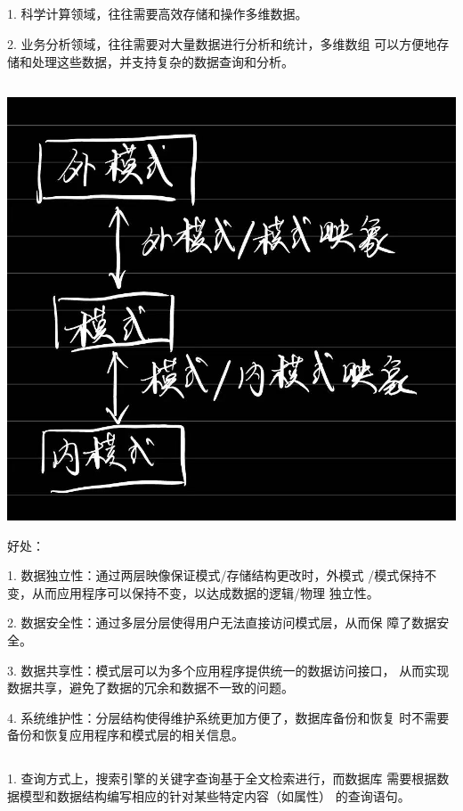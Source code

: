 \documentclass[UTF8]{ctexart}
\begin{document}
\subsection{}

1. 科学计算领域，往往需要高效存储和操作多维数据。

2. 业务分析领域，往往需要对大量数据进行分析和统计，多维数组
可以方便地存储和处理这些数据，并支持复杂的数据查询和分析。

\subsection{}

\includegraphics[width=.8\textwidth]{./pics/1.jpeg}

好处：

1. 数据独立性：通过两层映像保证模式/存储结构更改时，外模式
/模式保持不变，从而应用程序可以保持不变，以达成数据的逻辑/物理
独立性。

2. 数据安全性：通过多层分层使得用户无法直接访问模式层，从而保
障了数据安全。

3. 数据共享性：模式层可以为多个应用程序提供统一的数据访问接口，
从而实现数据共享，避免了数据的冗余和数据不一致的问题。

4. 系统维护性：分层结构使得维护系统更加方便了，数据库备份和恢复
时不需要备份和恢复应用程序和模式层的相关信息。

\subsection{}

1. 查询方式上，搜索引擎的关键字查询基于全文检索进行，而数据库
需要根据数据模型和数据结构编写相应的针对某些特定内容（如属性）
的查询语句。
\end{document}
